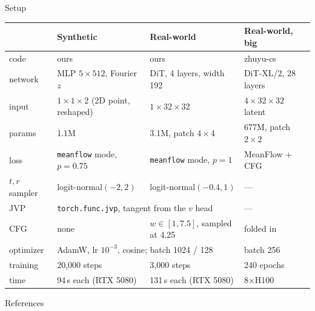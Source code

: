 \documentclass[aspectratio=169,12pt]{beamer}
\begin{document}
\begin{frame}{Setup}
  \centering\scriptsize
  \renewcommand{\arraystretch}{1.15}\setlength{\tabcolsep}{5pt}
  \begin{tabular}{@{}llll@{}}
    \toprule
    & \bfseries Synthetic & \bfseries Real-world & \bfseries Real-world, big \\
    \midrule
    code         & ours                                & ours                                  & zhuyu-cs \\
    network      & MLP $5{\times}512$, Fourier $z$ & DiT, 4 layers, width 192 & DiT-XL/2, 28 layers \\
    input        & $1{\times}1{\times}2$ (2D point, reshaped) & $1{\times}32{\times}32$         & $4{\times}32{\times}32$ latent \\
    params       & 1.1M                                & 3.1M, patch $4{\times}4$              & 677M, patch $2{\times}2$ \\
    loss         & \texttt{meanflow} mode, $p = 0.75$  & \texttt{meanflow} mode, $p = 1$       & MeanFlow + CFG \\
    $t, r$ sampler & logit-normal$(-2, 2)$             & logit-normal$(-0.4, 1)$               & --- \\
    JVP          & \multicolumn{2}{l}{\texttt{torch.func.jvp}, tangent from the $v$ head} & --- \\
    CFG          & none                                & $w \in [1, 7.5]$, sampled at 4.25     & folded in \\
    optimizer    & \multicolumn{2}{l}{AdamW, lr $10^{-3}$, cosine; batch 1024 / 128}         & batch 256 \\
    training     & 20{,}000 steps                      & 3{,}000 steps                         & 240 epochs \\
    time         & 94\,s each (RTX 5080)               & 131\,s each (RTX 5080)                & 8$\times$H100 \\
    \bottomrule
  \end{tabular}
\end{frame}

\begin{frame}[allowframebreaks]{References}
  \scriptsize
  
\end{frame}
\end{document}
